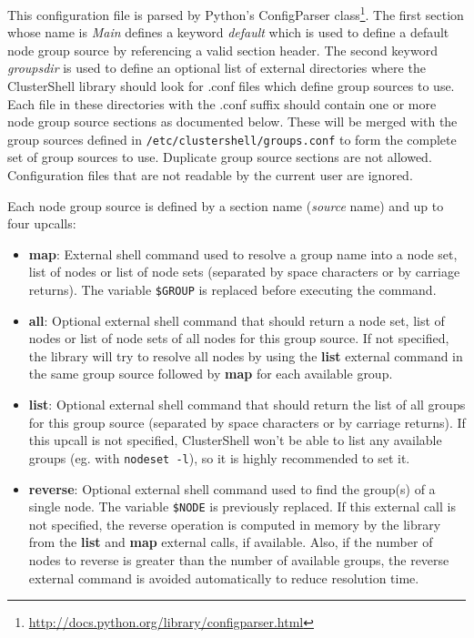 \documentclass[english,a4paper]{csuserguide}
\begin{document}
This configuration file is parsed by Python's ConfigParser class\footnote{\url{http://docs.python.org/library/configparser.html}}. The first section whose name is \textit{Main} defines a keyword \textit{default} which is used to define a default node group source by referencing a valid section header. The second keyword \textit{groupsdir} is used to define an optional list of external directories where the ClusterShell library should look for .conf files which define group sources to use. Each file in these directories with the .conf suffix should contain one or more node group source sections as documented below. These will be merged with the group sources defined in \texttt{/etc/clustershell/groups.conf} to form the complete set of group sources to use. Duplicate group source sections are not allowed. Configuration files that are not readable by the current user are ignored.


Each node group source is defined by a section name (\textit{source} name) and up to four upcalls:
\begin{itemize}
\item{\textbf{map}: External shell command used to resolve a group name into a node set, list of nodes or list of node sets (separated by space characters or by carriage returns). The variable \verb+$GROUP+ is replaced before executing the command.}
\item{\textbf{all}: Optional external shell command that should return a node set, list of nodes or list of node sets of all nodes for this group source. If not specified, the library will try to resolve all nodes by using the \textbf{list} external command in the same group source followed by \textbf{map} for each available group.}
\item{\textbf{list}: Optional external shell command that should return the list of all groups for this group source (separated by space characters or by carriage returns). If this upcall is not specified, ClusterShell won't be able to list any available groups (eg. with \texttt{nodeset -l}), so it is highly recommended to set it.}
\item{\textbf{reverse}: Optional external shell command used to find the group(s) of a single node. The variable \verb+$NODE+ is previously replaced. If this external call is not specified, the reverse operation is computed in memory by the library from the \textbf{list} and \textbf{map} external calls, if available. Also, if the number of nodes to reverse is greater than the number of available groups, the reverse external command is avoided automatically to reduce resolution time.}
\end{itemize}
\end{document}
